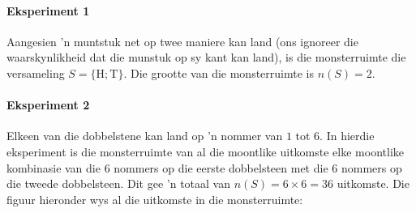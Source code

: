 \paragraph{Eksperiment 1} Aangesien 'n muntstuk net op twee maniere kan land (ons ignoreer die waarskynlikheid dat die munstuk op sy kant kan land),  is die monsterruimte die versameling \(S=\{\mbox{H}; \mbox{T}\}\). Die grootte van die monsterruimte is \(n(S)=2\).

\begin{figure}[H]
  \begin{center}
  \end{center}
\end{figure}

\paragraph{Eksperiment 2} Elkeen van die dobbelstene kan land op 'n nommer van $1$ tot $6$. In hierdie eksperiment is die monsterruimte van al die moontlike uitkomste elke moontlike kombinasie van die $6$ nommers op die eerste dobbelsteen met die $6$ nommers op die tweede dobbelsteen. Dit gee 'n totaal van \(n(S) = 6 \times 6
= 36\) uitkomste. Die figuur hieronder wys al die uitkomste in die monsterruimte:

\begin{figure}[h]
\begin{center}
\end{center}
\end{figure}

